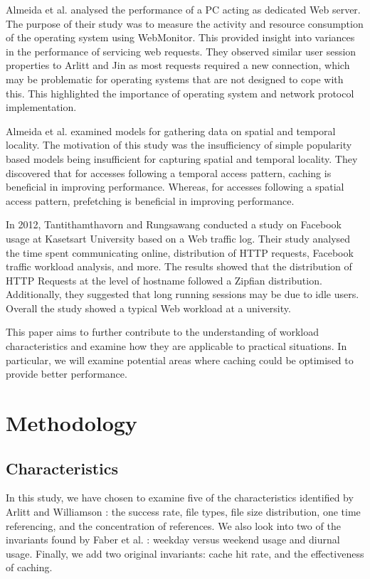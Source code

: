 \documentclass[10pt,conference]{IEEEtran}
\begin{document}
Almeida et al. \cite{almeida} analysed the performance of a PC acting as dedicated Web server. The purpose of their study was to measure the activity and resource consumption of the operating system using WebMonitor. This provided insight into variances in the performance of servicing web requests. They observed similar user session properties to Arlitt and Jin \cite{world_cup} as most requests required a new connection, which may be problematic for operating systems that are not designed to cope with this. This highlighted the importance of operating system and network protocol implementation.

Almeida et al. \cite{reference_locality} examined models for gathering data on spatial and temporal locality. The motivation of this study was the insufficiency of simple popularity based models being insufficient for capturing spatial and temporal locality. They discovered that for accesses following a temporal access pattern, caching is beneficial in improving performance. Whereas, for accesses following a spatial access pattern, prefetching is beneficial in improving performance.

In 2012, Tantithamthavorn and Rungsawang \cite{facebook} conducted a study on Facebook usage at Kasetsart University based on a Web traffic log. Their study analysed the time spent communicating online, distribution of HTTP requests, Facebook traffic workload analysis, and more. The results showed that the distribution of HTTP Requests at the level of hostname followed a Zipfian distribution. Additionally, they suggested that long running sessions may be due to idle users. Overall the study showed a typical Web workload at a university.

This paper aims to further contribute to the understanding of workload characteristics and examine how they are applicable to practical situations. In particular, we will examine potential areas where caching could be optimised to provide better performance.

\section{Methodology}\label{methodology}
\subsection{Characteristics}\label{lab:characteristics}
In this study, we have chosen to examine five of the characteristics identified by Arlitt and Williamson \cite{keynote}: the success rate, file types, file size distribution, one time referencing, and the concentration of references. We also look into two of the invariants found by Faber et al. \cite{Faber}: weekday versus weekend usage and diurnal usage. Finally, we add two original invariants: cache hit rate, and the effectiveness of caching.
\end{document}

